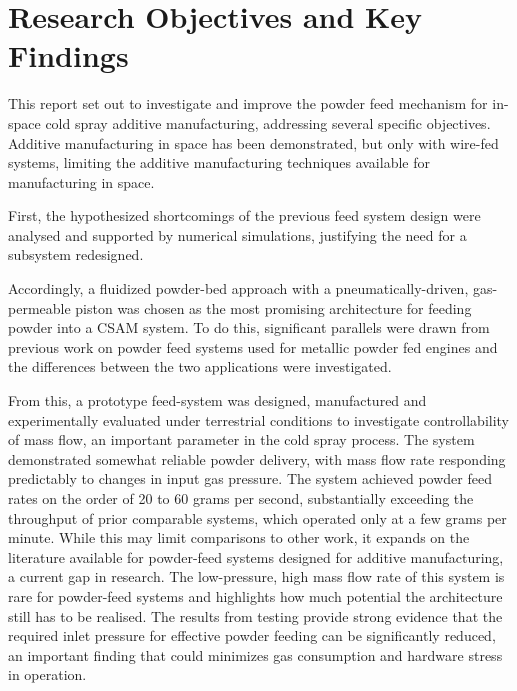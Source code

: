 





\section{Research Objectives and Key Findings}
This report set out to investigate and improve the powder feed mechanism for in-space cold spray additive manufacturing, addressing several specific objectives. Additive manufacturing in space has been demonstrated, but only with wire-fed systems, limiting the additive manufacturing techniques available for manufacturing in space.

First, the hypothesized shortcomings of the previous feed system design were analysed and supported by numerical simulations, justifying the need for a subsystem redesigned. 

Accordingly, a fluidized powder-bed approach with a pneumatically-driven, gas-permeable piston was chosen as the most promising architecture for feeding powder into a CSAM system. To do this, significant parallels were drawn from previous work on powder feed systems used for metallic powder fed engines and the differences between the two applications were investigated.

From this, a prototype feed-system was designed, manufactured and experimentally evaluated under terrestrial conditions to investigate controllability of mass flow, an important parameter in the cold spray process. The system demonstrated somewhat reliable powder delivery, with mass flow rate responding predictably to changes in input gas pressure. The system achieved powder feed rates on the order of 20 to 60 grams per second, substantially exceeding the throughput of prior comparable systems, which operated only at a few grams per minute. While this may limit comparisons to other work, it expands on the literature available for powder-feed systems designed for additive manufacturing, a current gap in research. The low-pressure, high mass flow rate of this system is rare for powder-feed systems and highlights how much potential the architecture still has to be realised. The results from testing provide strong evidence that the required inlet pressure for effective powder feeding can be significantly reduced, an important finding that could minimizes gas consumption and hardware stress in operation. 

